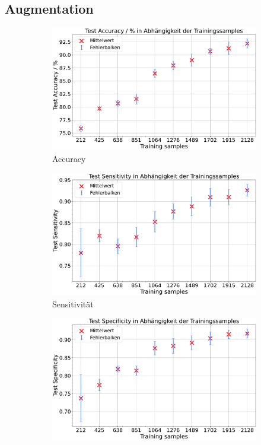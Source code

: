 \subsection{Augmentation}

\begin{figure}[htbp]
  \centering
  \begin{subfigure}[b]{0.48\textwidth}
    \centering
    \includegraphics[width=\textwidth]{plots/Augm-Gli-Men_Accuracy_mean.pdf}
    \caption{Accuracy}
    \label{fig:augm-acc}
  \end{subfigure}
  \begin{subfigure}[b]{0.48\textwidth}
    \centering
    \includegraphics[width=\textwidth]{plots/Augm-Gli-Men_Sensitivity_mean.pdf}
    \caption{Sensitivität}
    \label{fig:augm-sens}
  \end{subfigure}
  \begin{subfigure}[b]{0.48\textwidth}
    \centering
    \includegraphics[width=\textwidth]{plots/Augm-Gli-Men_Specificity_mean.pdf}

\end{subfigure}
\end{figure}

